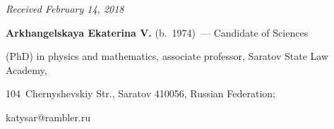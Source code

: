 \vspace*{-3pt}





\hfill{\small\textit{Received February 14, 2018}}  





\Contrl





  \noindent


  \textbf{Arkhangelskaya Ekaterina V.} (b.\ 1974)~--- Candidate of Sciences 


(PhD) in physics and mathematics, associate professor, Saratov State Law Academy, 


104~Chernyshevskiy Str., Saratov 410056, Russian Federation; 


\mbox{katysar@rambler.ru}





\label{end\stat}








\renewcommand{\bibname}{\protect\rm Литература}


